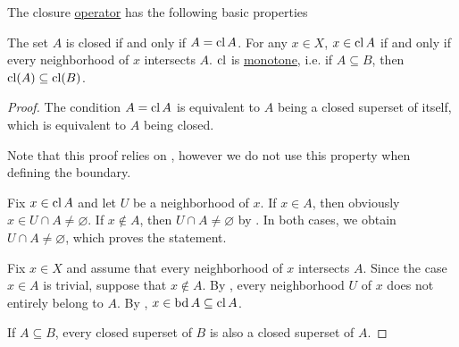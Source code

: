 \begin{proposition}\label{thm:closure_operator_properties}
  The closure \hyperref[def:closure_operator]{operator} has the following basic properties
  \begin{PropEnum}
     The set \( A \) is closed if and only if \( A = \operatorname{cl} A \).
     For any \( x \in X \), \( x \in \operatorname{cl} A \) if and only if every neighborhood of \( x \) intersects \( A \).
     \( \operatorname{cl} \) is \hyperref[def:monotone_map]{monotone}, i.e. if \( A \subseteq B \), then \( \operatorname{cl}(A) \subseteq \operatorname{cl}(B) \).
  \end{PropEnum}
\end{proposition}
\begin{proof}
   The condition \( A = \operatorname{cl}{A} \) is equivalent to \( A \) being a closed superset of itself, which is equivalent to \( A \) being closed.

   Note that this proof relies on , however we do not use this property when defining the boundary.

  \Sufficiency Fix \( x \in \operatorname{cl}{A} \) and let \( U \) be a neighborhood of \( x \). If \( x \in A \), then obviously \( x \in U \cap A \neq \varnothing \). If \( x \not\in A \), then \( U \cap A \neq \varnothing \) by . In both cases, we obtain \( U \cap A \neq \varnothing \), which proves the statement.

  \Necessity Fix \( x \in X \) and assume that every neighborhood of \( x \) intersects \( A \). Since the case \( x \in A \) is trivial, suppose that \( x \not\in A \). By , every neighborhood \( U \) of \( x \) does not entirely belong to \( A \). By , \( x \in \operatorname{bd} A \subseteq \operatorname{cl} A \).

   If \( A \subseteq B \), every closed superset of \( B \) is also a closed superset of \( A \).
\end{proof}

